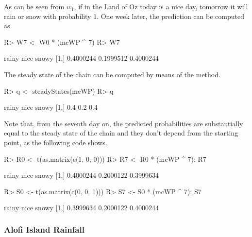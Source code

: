 \documentclass[nojss]{jss}
\begin{document}
As can be seen from $w_{1}$, if in the Land of Oz today is a nice day, tomorrow it will rain or snow with probability 1. One week later, the prediction can be computed as

\begin{Schunk}
\begin{Sinput}
R> W7 <- W0 * (mcWP ^ 7)
R> W7
\end{Sinput}
\begin{Soutput}
         rainy      nice     snowy
[1,] 0.4000244 0.1999512 0.4000244
\end{Soutput}
\end{Schunk}

The steady state of the chain can be computed by means of the  method.

\begin{Schunk}
\begin{Sinput}
R> q <- steadyStates(mcWP)
R> q
\end{Sinput}
\begin{Soutput}
     rainy nice snowy
[1,]   0.4  0.2   0.4
\end{Soutput}
\end{Schunk}

Note that, from the seventh day on, the predicted probabilities are substantially equal to the steady state of the chain and they don't depend from the starting point, as the following code shows.


\begin{Schunk}
\begin{Sinput}
R> R0 <- t(as.matrix(c(1, 0, 0)))
R> R7 <- R0 * (mcWP ^ 7); R7
\end{Sinput}
\begin{Soutput}
         rainy      nice     snowy
[1,] 0.4000244 0.2000122 0.3999634
\end{Soutput}
\begin{Sinput}
R> S0 <- t(as.matrix(c(0, 0, 1)))
R> S7 <- S0 * (mcWP ^ 7); S7
\end{Sinput}
\begin{Soutput}
         rainy      nice     snowy
[1,] 0.3999634 0.2000122 0.4000244
\end{Soutput}
\end{Schunk}

\subsubsection{Alofi Island Rainfall}\label{sec:wfAlofi}
\end{document}
